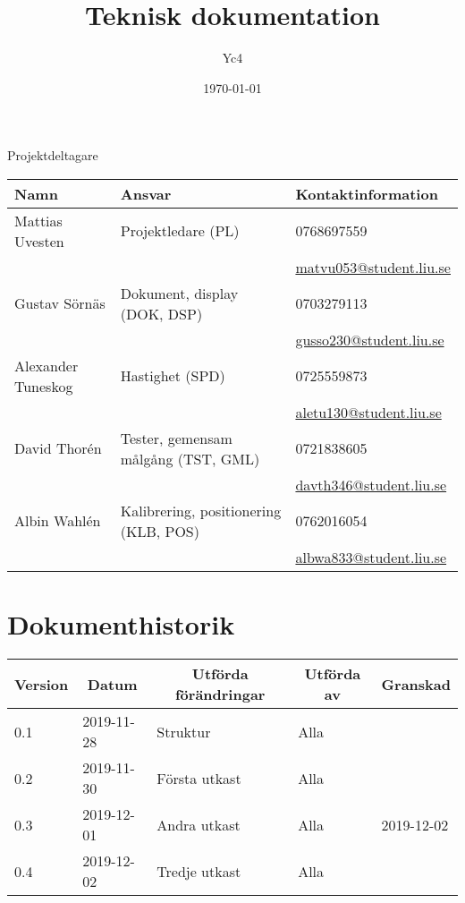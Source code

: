 \documentclass[10pt,oneside,swedish]{lips-no_customer}
\title{Teknisk dokumentation}
\author{Yc4}
\date{\today}
\begin{document}
\maketitle

\cleardoublepage
\makeprojectid

\begin{center}
  \Large Projektdeltagare
\end{center}
\begin{center}
  \begin{tabular}{|l|l|l|}
    \hline
			\textbf{Namn} & \textbf{Ansvar} & \textbf{Kontaktinformation}\\
		\hline
			Mattias Uvesten & Projektledare (PL) & 0768697559\\
			&& \url{matvu053@student.liu.se} \\
    \hline
			Gustav Sörnäs & Dokument, display (DOK, DSP) & 0703279113\\
			&& \url{gusso230@student.liu.se} \\
    \hline
			Alexander Tuneskog & Hastighet (SPD) & 0725559873 \\
			&& \url{aletu130@student.liu.se} \\
    \hline
			David Thorén & Tester, gemensam målgång (TST, GML) & 0721838605 \\
			&& \url{davth346@student.liu.se} \\
    \hline
			Albin Wahlén & Kalibrering, positionering (KLB, POS) & 0762016054 \\
			&& \url{albwa833@student.liu.se} \\
    \hline
  \end{tabular}
\end{center}

\section*{Dokumenthistorik}
\begin{tabular}{|p{}|p{}|p{}|p{}|p{}|} 
	\hline
  \multicolumn{1}{|c}{\bfseries Version} & 
  \multicolumn{1}{|c}{\bfseries Datum} & 
  \multicolumn{1}{|c}{\bfseries Utförda förändringar} & 
  \multicolumn{1}{|c}{\bfseries Utförda av} & 
	\multicolumn{1}{|c|}{\bfseries Granskad}\\
  \hline
	\hline
		0.1 & 2019-11-28 & Struktur & Alla & \\
  \hline
		0.2 & 2019-11-30 & Första utkast & Alla & \\
  \hline
		0.3 & 2019-12-01 & Andra utkast & Alla & 2019-12-02 \\
  \hline
 		0.4 & 2019-12-02 & Tredje utkast & Alla & \\
  \hline
  
\end{tabular}
\end{document}

